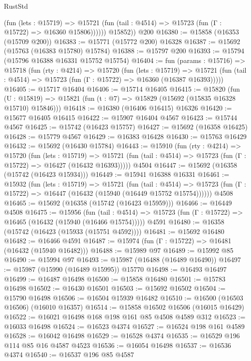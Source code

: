 \begin{lexlean}{RustStd}
\begin{coremodule}
              (fun (lets : @15719) =>
              @15721 (fun (tail : @4514) => @15723 (fun (Γ : @15722) => @16360 @15806))))))
        @15852))
    @200
@16380 := @15858 (@16353 (@15709 @200))
@16383 := @15771 (@15772 @200) @16328
@16387 := @15692 (@15763 (@16383 @15780) @15784)
@16388 := @15797 @200
@16393 := @15794 (@15796 @16388 @16331 @15752 @15754)
@16404 := fun (params : @15716) =>
  @15718
    (fun (rty : @4214) =>
    @15720
      (fun (lets : @15719) =>
      @15721 (fun (tail : @4514) => @15723 (fun (Γ : @15722) => @16360 (@16387 @16393)))))
@16405 := @15717 @16404
@16406 := @15714 @16405
@16415 := @15820
    (fun (U : @15819) => @15821 (fun (t : @7) => @15829 (@15692 (@15835 @16328 @15710) @15846)))
@16418 := @16380 (@16406 @16415) @16326
@16420 := @15677 @16405 @16415
@16422 := @15907 @16404 @4567
@16423 := @15744 @4567
@16425 := @15742 (@16423 @15757)
@16427 := @15692 (@16358 @16425)
@16428 := @15779 @4567
@16429 := @16383 @16428
@16430 := @15763 @16429
@16432 := @15692 (@16430 @15784)
@16443 := @15910
    (fun (rty : @4214) =>
    @15720
      (fun (lets : @15719) =>
      @15721 (fun (tail : @4514) => @15723 (fun (Γ : @15722) => @16427 (@16432 @16393)))))
    @4504
@16447 := @15692 (@16358 (@15742 (@16423 @15934)))
@16449 := @15941 @16388 @16331
@16461 := @15932
    (fun (lets : @15719) =>
    @15721
      (fun (tail : @4514) =>
      @15723 (fun (Γ : @15722) => @16447 (@16432 (@15940 (@16449 @15752 @15754))))))
    @4508
@16465 := @15692 (@16358 (@15742 (@16423 @15959)))
@16466 := @16449 @4508
@16475 := @15956
    (fun (tail : @4514) => @15723 (fun (Γ : @15722) => @16465 (@16432 (@15940 (@16466 @15754)))))
    @4591
@16480 := @16358 (@15742 (@16423 (@15933 (@15751 @4592))))
@16481 := @15692 @16480
@16482 := @16466 @4591
@16487 := @15974 (fun (Γ : @15722) => @16481 (@16432 (@15940 @16482)))
@16488 := @15989 @97
@16489 := @15992 @85
@16490 := @15994 @97
@16493 := @15987 (@16488 (@16489 @16490))
@16497 := @15987 (@15990 (@16489 @15995)) @15770
@16498 := @16493 @16497
@16499 := @16487 @16498
@16500 := @15858 @16480
@16501 := @15783 @16498
@16502 := @16430 @16501
@16503 := @15692 @16502
@16504 := @15790 @16498
@16506 := @16504 @15939 @16482
@16510 := @16500 (@16503 @16506) (@16010 @16357)
@16514 := @15858 @16502 @16506 (@16015 @16429)
@16522 := @16021 @16498 @168 @198 @161 @85 @4508 @4589 @312
@16523 := @16033 @16498
@16524 := @16523 @4374
@16527 := @16524 @198 @161 @4589
@16528 := @16042 @16498
@16529 := @16528 @4374
@16535 := @16529 @196 @114 @85 @16 @4587 @4523
@16536 := @16054 @16498
@16537 := @16536 @4374
@16540 := @16537 @196 @85 @4587

\end{coremodule}
\end{lexlean}
